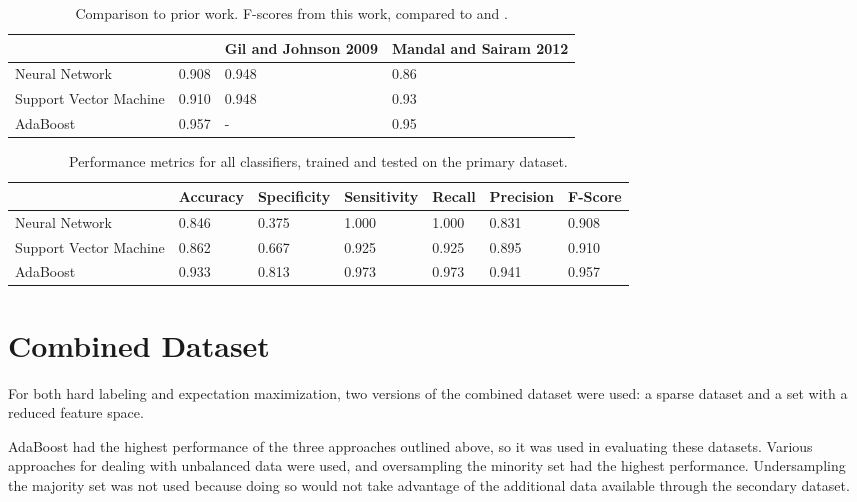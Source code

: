 \documentclass[draftcopy]{srpaper}
\begin{document}
\begin{table}
\begin{center}
\begin{tabular}{|l|l|l|l|}
\hline

 & & Gil and Johnson 2009 & Mandal and Sairam 2012 \\ \hline
Neural Network & 0.908 & 0.948 & 0.86 \\ \hline
Support Vector Machine & 0.910 & 0.948 & 0.93 \\ \hline
AdaBoost & 0.957 & - & 0.95\\ \hline

\end{tabular}
\end{center}
\caption[Comparison to Prior Work]{Comparison to prior work. F-scores
  from this work, compared to \cite{GJ70} and \cite{MS12}.}
\label{table:comparison}
\end{table}

\begin{table}
\begin{center}
\begin{tabular}{|l|l|l|l|l|l|l|}
\hline

 & Accuracy & Specificity & Sensitivity & Recall & Precision & F-Score \\ \hline
Neural Network & 0.846 & 0.375 & 1.000 & 1.000 & 0.831 & 0.908 \\ \hline
Support Vector Machine & 0.862 & 0.667 & 0.925 & 0.925 & 0.895 & 0.910 \\ \hline
AdaBoost & 0.933 & 0.813 & 0.973 & 0.973 & 0.941 & 0.957 \\ \hline

\end{tabular}
\end{center}
\caption[Performance for all Classifiers]{Performance metrics for all
  classifiers, trained and tested on the primary dataset.}
\label{table:performance}
\end{table}

\section{Combined Dataset}
For both hard labeling and expectation maximization, two versions of
the combined dataset were used: a sparse dataset and a set with a
reduced feature space.

AdaBoost had the highest performance of the three approaches outlined
above, so it was used in evaluating these datasets. Various approaches
for dealing with unbalanced data were used, and oversampling the
minority set had the highest performance. Undersampling the majority
set was not used because doing so would not take advantage of the
additional data available through the secondary dataset.
\end{document}
